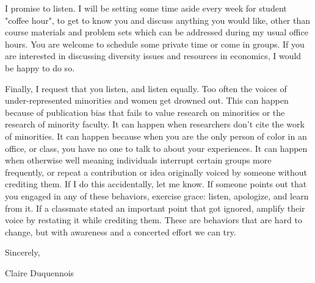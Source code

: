 \documentclass[a4paper, 10pt]{article}
\begin{document}
I promise to listen. I will be setting some time aside every week for student "coffee hour", to get to know you and discuss anything you would like, other than course materials and problem sets which can be addressed during my usual office hours. You are welcome to schedule some private time or come in groups. If you are interested in discussing diversity issues and resources in economics, I would be happy to do so.  

Finally, I request that you listen, and listen equally. Too often the voices of under-represented minorities and women get drowned out. This can happen because of publication bias that fails to value research on minorities or the research of minority faculty. It can happen when researchers don't cite the work of minorities.  It can happen because when you are the only person of color in an office, or class, you have no one to talk to about your experiences. It can happen when otherwise well meaning individuals interrupt certain groups more frequently, or repeat a contribution or idea originally voiced by someone without crediting them. If I do this accidentally, let me know. If someone points out that you engaged in any of these behaviors, exercise grace: listen, apologize, and learn from it.  If a classmate stated an important point that got ignored, amplify their voice by restating it while crediting them. These are behaviors that are hard to change, but with awareness and a concerted effort we can try. 
\vspace{3mm}

\noindent Sincerely, 


\noindent Claire Duquennois
\end{document}
